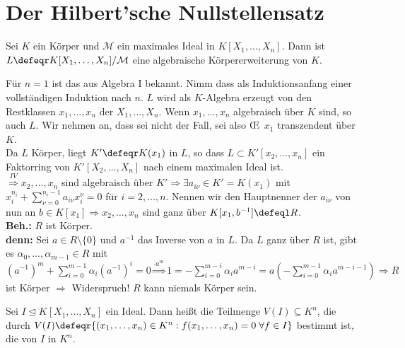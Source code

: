 \section{Der Hilbert'sche Nullstellensatz}

\begin{Satz}
\label{Satz5}
  Sei $K$ ein Körper und $\mathcal{M}$ ein maximales Ideal in $K[X_1, \dots,
  X_n]$. Dann ist $L \defeqr K[X_1, \dots, X_n] / \mathcal{M}$ eine algebraische
  Körpererweiterung von $K$.
\end{Satz}

\begin{Bew}
  Für $n=1$ ist das aus Algebra I bekannt. Nimm dass als Induktionsanfang einer
  vollständigen Induktion nach $n$.
  $L$ wird als $K$-Algebra erzeugt von den Restklassen $x_1, \dots, x_n$ der
  $X_1, \dots, X_n$. Wenn $x_1, \dots, x_n$ algebraisch über $K$ sind, so auch
  $L$. Wir nehmen an, dass sei nicht der Fall, sei also \OE\ $x_1$ transzendent
  über $K$.\\
  Da $L$ Körper, liegt $K' \defeqr K(x_1)$ in $L$, so dass $L \subset K'[x_2,
  \dots, x_n]$ ein Faktorring von $K'[X_2, \dots, X_n]$ nach einem maximalen
  Ideal ist.\\
  $\overset{IV}{\Rightarrow} x_2, \dots, x_n$ sind algebraisch über $K'
  \Rightarrow \exists a_{i \nu} \in K'=K(x_1)$ mit $x_i^{n_i} + \sum_{\nu =
  0}^{n_i -1} a_{i \nu} x_i^{\nu} = 0$ für $i = 2, \dots, n$.
  Nennen wir den Hauptnenner der $a_{i \nu}$ von nun an $b \in K[x_1] \Rightarrow
  x_2, \dots, x_n$ sind ganz über $K[x_1, b^{-1}] \defeql R$.\\
  \textbf{Beh.:} $R$ ist Körper.\\
  \textbf{denn:} Sei $a \in R \setminus \{0\}$ und $a^{-1}$ das Inverse von $a$
  in $L$. Da $L$ ganz über $R$ ist, gibt es $\alpha_0, \dots, \alpha_{m-1} \in
  R$ mit $(a^{-1})^m + \sum_{i = 0}^{m-1} \alpha_i (a^{-1})^i = 0 \overset{
  \cdot a^m}{\Rightarrow} 1 = -\sum_{i=0}^{m-i} \alpha_i a^{m-i} = a
  (-\sum_{i=0}^{m-1} \alpha_i a^{m-i-1}) \Rightarrow R$ ist Körper $\Rightarrow$
  Widerspruch! $R$ kann niemals Körper sein.
\end{Bew}

\begin{Def}
  Sei $I \trianglelefteq K[X_1, \dots, X_n]$ ein Ideal. Dann heißt die Teilmenge
  $V(I) \subseteq K^n$, die durch $V(I) \defeqr \{(x_1, \dots, x_n) \in K^n:
  f(x_1, \dots, x_n) = 0 \; \forall f \in I\}$ bestimmt ist, die
   von $I$ in $K^n$.
\end{Def}

